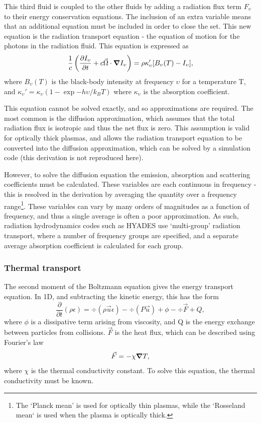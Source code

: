 This third fluid is coupled to the other fluids by adding a radiation flux term $F_{\upsilon}$ to their energy conservation equations. The inclusion of an extra variable means that an additional equation must be included in order to close the set. This new equation is the radiation transport equation - the equation of motion for the photons in the radiation fluid. This equation is expressed as 
\begin{equation} \frac{1}{c} \left( \frac{\partial I_\upsilon}{\partial t} + c \vec{\Omega} \cdot \grad I_{\upsilon} \right) = \rho \kappa_\upsilon' [B_\upsilon (T) - I_\upsilon], \end{equation} where $B_\upsilon (T)$ is the black-body intensity at frequency $\upsilon$ for a temperature T, and $\kappa_\upsilon' = \kappa_\upsilon ( 1 - \exp{-h\upsilon / k_B T})$ where $\kappa_\upsilon$ is the absorption coefficient.

This equation cannot be solved exactly, and so approximations are required. The most common is the diffusion approximation, which assumes that the total radiation flux is isotropic and thus the net flux is zero. This assumption is valid for optically thick plasmas, and allows the radiation transport equation to be converted into the diffusion approximation, which can be solved by a simulation code (this derivation is not reproduced here). 

However, to solve the diffusion equation the emission, absorption and scattering coefficients must be calculated. These variables are each continuous in frequency - this is resolved in the derivation by averaging the quantity over a frequency range\footnote{The `Planck mean' is used for optically thin plasmas, while the `Rosseland mean` is used when the plasma is optically thick.}. These variables can vary by many orders of magnitudes as a function of frequency, and thus a single average is often a poor approximation. As such, radiation hydrodynamics codes such as HYADES use `multi-group' radiation transport, where a number of frequency groups are specified, and a separate average absorption coefficient is calculated for each group.

\subsubsection{Thermal transport}

The second moment of the Boltzmann equation gives the energy transport equation. In 1D, and subtracting the kinetic energy, this has the form
\begin{equation} \frac{ \partial}{\partial t} (\rho \epsilon) = \div (\rho \vec{u} \epsilon) - \div (P \vec{u}) + \phi - \div \vec{F} + Q, \end{equation}
where $\phi$ is a dissipative term arising from viscosity, and Q is the energy exchange between particles from collisions. $\vec{F}$ is the heat flux, which can be described using Fourier's law 
\begin{equation} \vec{F} = - \chi \grad T, \end{equation} where $\chi$ is the thermal conductivity constant. To solve this equation, the thermal conductivity must be known.


